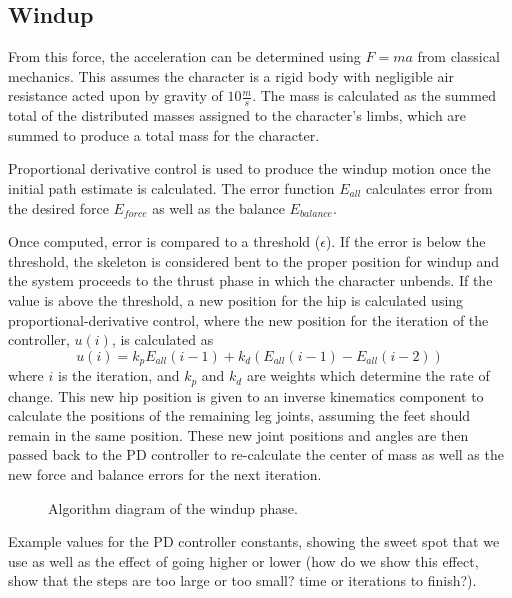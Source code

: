 \subsection{Windup}
From this force, the acceleration can be determined using $F=ma$ from classical mechanics.  This assumes the character is a rigid body with negligible air resistance acted upon by gravity of $10\frac{m}{s}$.  The mass is calculated as the summed total of the distributed masses assigned to the character's limbs, which are summed to produce a total mass for the character.

Proportional derivative control is used to produce the windup motion once the initial path estimate is calculated.  The error function $E_{all}$ calculates error from the desired force $E_{force}$ as well as the balance $E_{balance}$.

Once computed, error is compared to a threshold ($\epsilon$).  If the error is below the threshold, the skeleton is considered bent to the proper position for windup and the system proceeds to the thrust phase in which the character unbends.  If the value is above the threshold, a new position for the hip is calculated using proportional-derivative control, where the new position for the iteration of the controller, $u(i)$, is calculated as \[u(i) = k_p E_{all}(i - 1) + k_d(E_{all}(i-1) - E_{all}(i-2))\] where $i$ is the iteration, and $k_p$ and $k_d$ are weights which determine the rate of change. This new hip position is given to an inverse kinematics component to calculate the positions of the remaining leg joints, assuming the feet should remain in the same position.  These new joint positions and angles are then passed back to the PD controller to re-calculate the center of mass as well as the new force and balance errors for the next iteration.

\begin{figure}[ht]
	\centering
	\resizebox{\textwidth}{!}{
		
	}
	\caption[Diagram of windup phase algorithm]{Algorithm diagram of the windup phase.}
	\label{fig:bendPhase}
\end{figure}

\begin{table}[ht]
	\centering
	\caption[Table of PD controller constants for windup phase]{Example values for the PD controller constants, showing the sweet spot that we use as well as the effect of going higher or lower (how do we show this effect, show that the steps are too large or too small? time or iterations to finish?).}
	\label{tab:windup_pd_vals}
\end{table}

